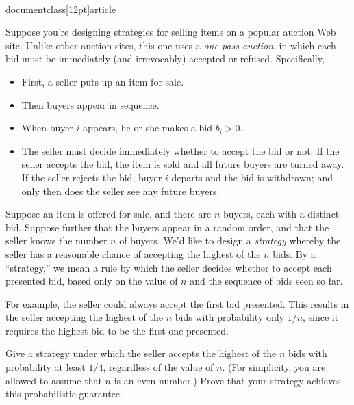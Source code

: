 \\documentclass[12pt]{article}
\begin{document}
\begin{enumerate}
Suppose you're designing strategies for
selling items on a popular auction Web site.
Unlike other auction sites,
this one uses a {\em one-pass auction},
in which each bid must be immediately (and irrevocably)
accepted or refused.
Specifically,
\begin{itemize}
\item First, a seller puts up an item for sale.
\item Then buyers appear in sequence.
\item When buyer $i$ appears, he or she makes a bid $b_i > 0$.
\item The seller must decide immediately whether
to accept the bid or not.
If the seller accepts the bid, the item is sold and
all future buyers are turned away.
If the seller rejects the bid, buyer $i$
departs and the bid is withdrawn; and only
then does the seller see any future buyers.
\end{itemize}

Suppose an item is offered for sale, and there
are $n$ buyers, each with a distinct bid.
Suppose further that the buyers appear in a random order, and that
the seller knows the number $n$ of buyers.
We'd like to design a {\em strategy} whereby the
seller has a reasonable chance of accepting the highest of
the $n$ bids.
By a ``strategy,'' we mean a rule by which the
seller decides whether to accept each presented bid,
based only on the value of $n$ and the sequence of bids seen so far.

For example, the seller could always accept the first bid presented.
This results in the seller accepting the highest of the $n$ bids
with probability only $1/n$, since it requires the highest
bid to be the first one presented.

Give a strategy under which the seller accepts the
highest of the $n$ bids with probability at least $1/4$,
regardless of the value of $n$.
(For simplicity, you are allowed to assume that $n$ is an even number.)
Prove that your strategy achieves this probabilistic guarantee.

\end{enumerate}
\end{document}
